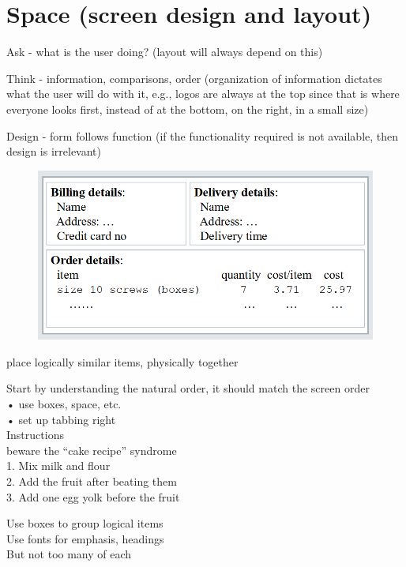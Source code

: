 \documentclass[]{project_plan}
\begin{document}
\newpage

\section{Space (screen design and layout)}

Ask    - what is the user doing? (layout will always depend on this)

Think  - information, comparisons, order (organization of information dictates what the user will do with it, e.g., logos are always at the top since that is where everyone looks first, instead of at the bottom, on the right, in a small size)

Design - form follows function (if the functionality required is not available, then design is irrelevant)

\begin{figure}[ht!]
  \includegraphics[width=40em]{graphic_design_grouping_items.png}
\end{figure}

place logically similar items, physically together

Start by understanding the natural order, it should match the screen order\\
• use boxes, space, etc.\\
• set up tabbing right\\

Instructions\\
beware the “cake recipe” syndrome\\
1. Mix milk and flour\\
2. Add the fruit after beating them\\
3. Add one egg yolk before the fruit

Use boxes to group logical items\\
Use fonts for emphasis, headings\\
But not too many of each
\end{document}
